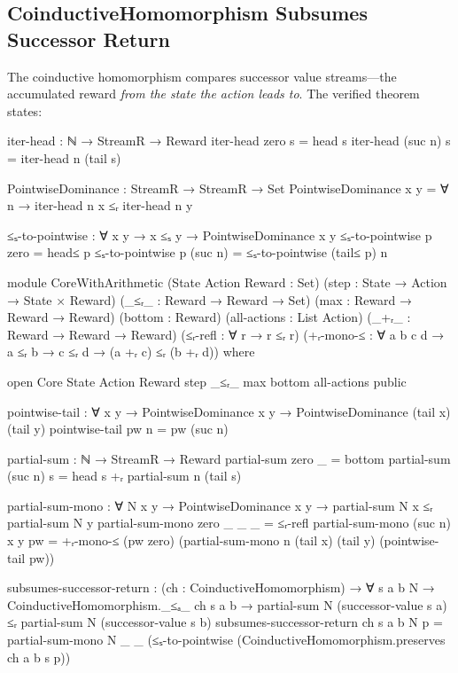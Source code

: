 \documentclass[9pt,a4paper]{article}
\theoremstyle{plain}
\theoremstyle{definition}
\theoremstyle{remark}
\begin{document}
\subsection{CoinductiveHomomorphism Subsumes Successor Return}

The coinductive homomorphism compares successor value streams---the accumulated reward \emph{from the state the action leads to}.  The verified theorem states:

\begin{code}[hide]
  iter-head : ℕ → StreamR → Reward
  iter-head zero    s = head s
  iter-head (suc n) s = iter-head n (tail s)

  PointwiseDominance : StreamR → StreamR → Set
  PointwiseDominance x y = ∀ n → iter-head n x ≤ᵣ iter-head n y

  ≤ₛ-to-pointwise : ∀ {x y} → x ≤ₛ y → PointwiseDominance x y
  ≤ₛ-to-pointwise p zero    = head≤ p
  ≤ₛ-to-pointwise p (suc n) = ≤ₛ-to-pointwise (tail≤ p) n
\end{code}

\begin{code}[hide]
module CoreWithArithmetic
  (State Action Reward : Set)
  (step                : State → Action → State × Reward)
  (_≤ᵣ_                : Reward → Reward → Set)
  (max                 : Reward → Reward → Reward)
  (bottom              : Reward)
  (all-actions         : List Action)
  (_+ᵣ_                : Reward → Reward → Reward)
  (≤ᵣ-refl             : ∀ {r} → r ≤ᵣ r)
  (+ᵣ-mono-≤           : ∀ {a b c d} → a ≤ᵣ b → c ≤ᵣ d → (a +ᵣ c) ≤ᵣ (b +ᵣ d))
  where

  open Core State Action Reward step _≤ᵣ_ max bottom all-actions public

  pointwise-tail : ∀ {x y} → PointwiseDominance x y → PointwiseDominance (tail x) (tail y)
  pointwise-tail pw n = pw (suc n)

  partial-sum : ℕ → StreamR → Reward
  partial-sum zero    _ = bottom
  partial-sum (suc n) s = head s +ᵣ partial-sum n (tail s)

  partial-sum-mono : ∀ N x y → PointwiseDominance x y →
                     partial-sum N x ≤ᵣ partial-sum N y
  partial-sum-mono zero _ _ _ = ≤ᵣ-refl
  partial-sum-mono (suc n) x y pw =
    +ᵣ-mono-≤ (pw zero) (partial-sum-mono n (tail x) (tail y) (pointwise-tail pw))
\end{code}

\begin{code}
  subsumes-successor-return : (ch : CoinductiveHomomorphism) →
    ∀ s a b N →
    CoinductiveHomomorphism._≤ₐ_ ch s a b →
    partial-sum N (successor-value s a) ≤ᵣ
    partial-sum N (successor-value s b)
  subsumes-successor-return ch s a b N p =
    partial-sum-mono N _ _ (≤ₛ-to-pointwise
      (CoinductiveHomomorphism.preserves ch a b s p))
\end{code}
\end{document}
